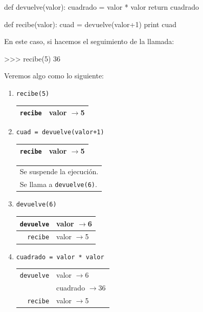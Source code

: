 \begin{codigo-python-sn}
def devuelve(valor):
    cuadrado = valor * valor
    return cuadrado

def recibe(valor):
    cuad = devuelve(valor+1)
    print cuad
\end{codigo-python-sn}

En este caso, si hacemos el seguimiento de la llamada:
\begin{codigo-python-sn}
>>> recibe(5)
36
\end{codigo-python-sn}

Veremos algo como lo siguiente:

\begin{enumerate}

\item  \verb|recibe(5)               | \hspace{1.5cm}
	\begin{tabular}{r|l|}
	\hline
	\verb|recibe|&valor $\rightarrow$5\\
	\hline
	\end{tabular}

\item  \verb|cuad = devuelve(valor+1)| \hspace{1.5cm}
	\begin{tabular}{r|l|}
	\hline
	\verb|recibe|&valor $\rightarrow$5\\
	\hline
	\end{tabular}
	\begin{tabular}{l}
	Se suspende la ejecución.\\
	Se llama a \verb|devuelve(6)|.
	\end{tabular}

\item  \verb|devuelve(6)             | \hspace{1.5cm}
	\begin{tabular}{r|l|}
	\hline
	\verb|devuelve|&valor $\rightarrow$6\\
	\hline
	\hline
	\verb|recibe|&valor $\rightarrow$5\\
	\hline
	\end{tabular}
	\hspace{1cm}
	
\item  \verb|cuadrado = valor * valor| \hspace{1.5cm}
	\begin{tabular}{r|l|}
	\hline
	\verb|devuelve|&valor $\rightarrow$6\\
	           &cuadrado $\rightarrow$36\\
	\hline
	\hline
	\verb|recibe|&valor $\rightarrow$5\\
	\hline
	\end{tabular}


\end{enumerate}
